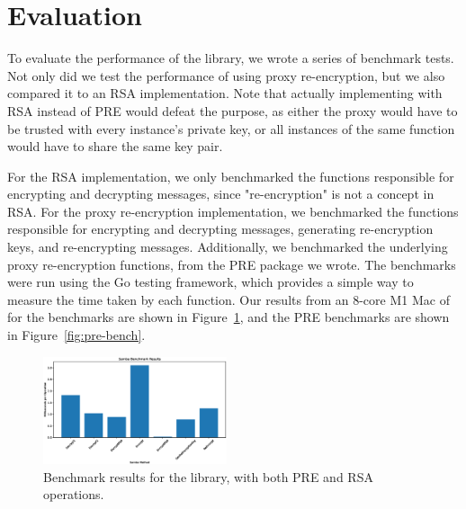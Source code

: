 \section{Evaluation}
\label{sec:evaluation}


To evaluate the performance of the \SystemName library, we wrote a series of benchmark tests.
Not only did we test the performance of \SystemName using proxy re-encryption, but we also compared it to an RSA implementation.
Note that actually implementing \SystemName with RSA instead of PRE would defeat the purpose, as either the proxy would have to be trusted with every instance's private key, or all instances of the same function would have to share the same key pair.

For the RSA implementation, we only benchmarked the functions responsible for encrypting and decrypting messages, since "re-encryption" is not a concept in RSA.
For the proxy re-encryption implementation, we benchmarked the \SystemName functions responsible for encrypting and decrypting messages, generating re-encryption keys, and re-encrypting messages.
Additionally, we benchmarked the underlying proxy re-encryption functions, from the PRE package we wrote.
The benchmarks were run using the Go testing framework, which provides a simple way to measure the time taken by each function.
Our results from an 8-core M1 Mac of for the \SystemName benchmarks are shown in Figure~\ref{fig:samba-bench}, and the PRE benchmarks are shown in Figure~\ref{fig:pre-bench}.

\begin{figure}
	\centering
	\includegraphics[width=0.48\textwidth]{figs/samba-bench}
	\caption{Benchmark results for the \SystemName library, with both PRE and RSA operations.}
	\label{fig:samba-bench}
\end{figure}

